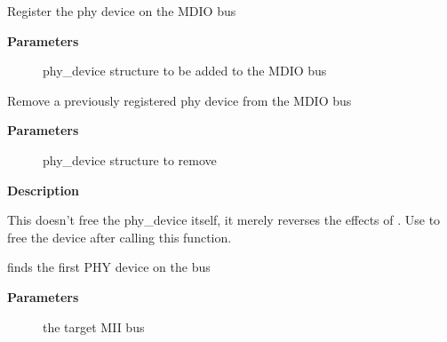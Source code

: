 \documentclass[a4paper,8pt,english]{sphinxmanual}
\begin{document}
\begin{fulllineitems}
\label{networking/kapi:c.phy_device_register}
Register the phy device on the MDIO bus

\end{fulllineitems}


\textbf{Parameters}
\begin{description}
\item[{}] \leavevmode
phy\_device structure to be added to the MDIO bus

\end{description}

\begin{fulllineitems}
\label{networking/kapi:c.phy_device_remove}
Remove a previously registered phy device from the MDIO bus

\end{fulllineitems}


\textbf{Parameters}
\begin{description}
\item[{}] \leavevmode
phy\_device structure to remove

\end{description}

\textbf{Description}

This doesn't free the phy\_device itself, it merely reverses the effects
of {\hyperref[networking/kapi:c.phy_device_register]{\emph{}}}. Use  to free the device
after calling this function.

\begin{fulllineitems}
\label{networking/kapi:c.phy_find_first}
finds the first PHY device on the bus

\end{fulllineitems}


\textbf{Parameters}
\begin{description}
\item[{}] \leavevmode
the target MII bus

\end{description}
\end{document}
